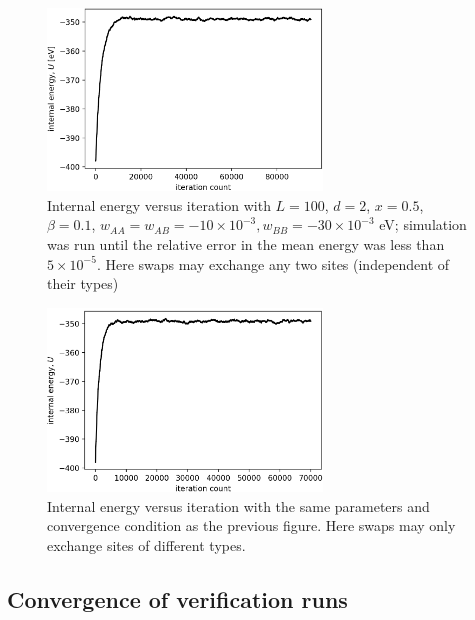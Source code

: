 \documentclass[10pt]{article}
\begin{document}
\begin{figure}[h!]
\centering
\includegraphics[width=0.65\textwidth]{Figures/swap_any_two_convergence.png}
\caption{Internal energy versus iteration with $L=100$, $d=2$, $x=0.5$, $\beta=0.1$, $w_{AA}=w_{AB}=-10 \times 10^{-3},w_{BB} = -30 \times 10^{-3}$ eV; simulation was run until the relative error in the mean energy was less than $5 \times 10^{-5}$.
Here swaps may exchange any two sites (independent of their types)}
\label{fig:swap_any}
\end{figure}

\begin{figure}[h!]
\centering
\includegraphics[width=0.65\textwidth]{Figures/swap_A_B_only_convergence.png}
\caption{Internal energy versus iteration with the same parameters and convergence condition as the previous figure.
Here swaps may only exchange sites of different types.}
\label{fig:swap_different}
\end{figure}


\clearpage
\subsection{Convergence of verification runs}
\end{document}
